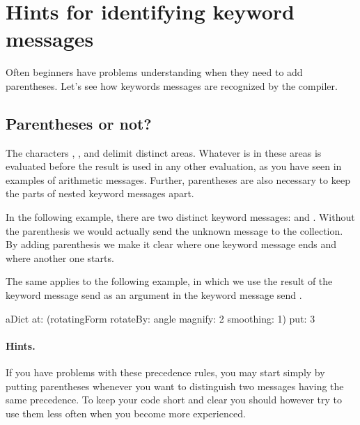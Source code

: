 \documentclass[a4paper,10pt,twoside]{book}
\begin{document}
\section{Hints for identifying keyword messages}
Often beginners have problems understanding when they need to add parentheses. Let's see how keywords messages are recognized by the compiler. 

\subsection{Parentheses or not?}
The characters \ct{[}, \ct{]}, \ct{(} and \ct{)} delimit distinct areas. Whatever is in these areas is evaluated before the result is used in any other evaluation, as you have seen in examples of arithmetic messages. Further, parentheses are also necessary to keep the parts of nested keyword messages apart.

In the following example, there are two distinct keyword messages:  and . Without the parenthesis we would actually send the unknown message  to the collection. By adding parenthesis we make it clear where one keyword message ends and where another one starts.


The same applies to the following example, in which we use the result of the keyword message send  as an argument in the keyword message send .

\begin{code}{}
aDict
   at: (rotatingForm 
          rotateBy: angle	
          magnify: 2 
          smoothing: 1)
   put: 3
\end{code}

\paragraph{Hints.} If you have problems with these precedence rules, you may start simply by putting parentheses whenever you want to distinguish two messages having the same precedence. To keep your code short and clear you should however try to use them less often when you become more experienced.
\end{document}
